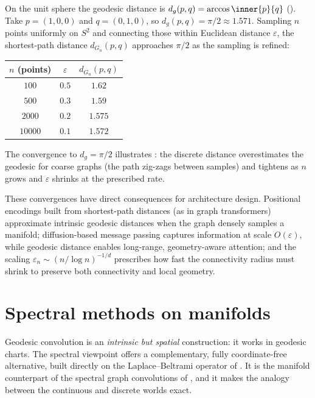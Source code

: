 \begin{example}
\label{ex:geo:sphere-numerical}
On the unit sphere the geodesic distance is $d_g(p,q) = \arccos\inner{p}{q}$
(). Take $p = (1,0,0)$ and $q = (0,1,0)$, so
$d_g(p,q) = \pi/2 \approx 1.571$. Sampling $n$ points uniformly on $S^2$ and
connecting those within Euclidean distance $\varepsilon$, the shortest-path
distance $d_{G_n}(p,q)$ approaches $\pi/2$ as the sampling is refined:
\begin{center}
\begin{tabular}{@{}ccc@{}}
\toprule
$n$ (points) & $\varepsilon$ & $d_{G_n}(p, q)$ \\
\midrule
$100$ & $0.5$ & $1.62$ \\
$500$ & $0.3$ & $1.59$ \\
$2000$ & $0.2$ & $1.575$ \\
$10000$ & $0.1$ & $1.572$ \\
\bottomrule
\end{tabular}
\end{center}
The convergence to $d_g = \pi/2$ illustrates :
the discrete distance overestimates the geodesic for coarse graphs (the path
zig-zags between samples) and tightens as $n$ grows and $\varepsilon$ shrinks at
the prescribed rate.
\end{example}

These convergences have direct consequences for architecture design. Positional
encodings built from shortest-path distances (as in graph transformers)
approximate intrinsic geodesic distances when the graph densely samples a
manifold; diffusion-based message passing captures information at scale
$O(\varepsilon)$, while geodesic distance enables long-range, geometry-aware
attention; and the scaling $\varepsilon_n \sim (n/\log n)^{-1/d}$ prescribes how
fast the connectivity radius must shrink to preserve both connectivity and local
geometry.

\section{Spectral methods on manifolds}
\label{sec:geo:spectral}

Geodesic convolution is an \emph{intrinsic but spatial} construction: it works
in geodesic charts. The spectral viewpoint offers a complementary, fully
coordinate-free alternative, built directly on the Laplace--Beltrami operator of
. It is the manifold counterpart of the spectral
graph convolutions of , and it makes the analogy between the
continuous and discrete worlds exact.

